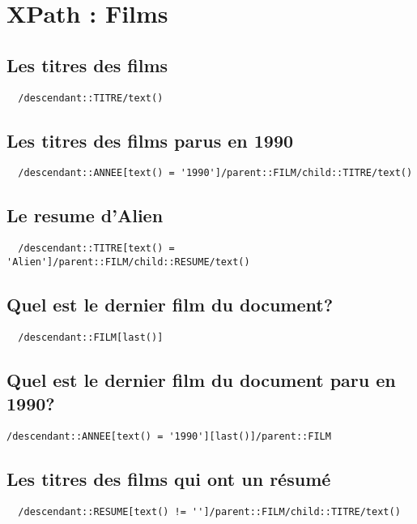 \chapter{XPath : Films}
\section{Les titres des films}
\begin{verbatim}
  /descendant::TITRE/text()
\end{verbatim}

\section{Les titres des films parus en 1990}
\begin{verbatim}
  /descendant::ANNEE[text() = '1990']/parent::FILM/child::TITRE/text()
\end{verbatim}

\section{Le resume d'Alien}
\begin{verbatim}
  /descendant::TITRE[text() = 'Alien']/parent::FILM/child::RESUME/text()
\end{verbatim}

\section{Quel est le dernier film du document?}
\begin{verbatim}
  /descendant::FILM[last()]
\end{verbatim}

\section{Quel est le dernier film du document paru en 1990?}
\begin{verbatim}
/descendant::ANNEE[text() = '1990'][last()]/parent::FILM
\end{verbatim}

\section{Les titres des films qui ont un résumé}
\begin{verbatim}
  /descendant::RESUME[text() != '']/parent::FILM/child::TITRE/text()
\end{verbatim}

